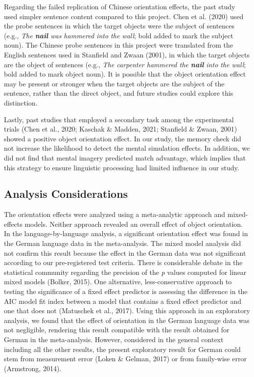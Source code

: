 \documentclass[
  man,floatsintext]{apa7}
\begin{document}
Regarding the failed replication of Chinese orientation effects, the
past study used simpler sentence content compared to this project.
Chen et al. (2020) used the probe sentences in which the target
objects were the subject of sentences (e.g., \emph{The \textbf{nail} was hammered
into the wall}; bold added to mark the subject noun). The Chinese probe
sentences in this project were translated from the English sentences
used in Stanfield and Zwaan (2001), in which the target objects are the
object of sentences (e.g., \emph{The carpenter hammered the \textbf{nail} into the
wall}; bold added to mark object noun). It is possible that the object
orientation effect may be present or stronger when the target objects
are the subject of the sentence, rather than the direct object, and
future studies could explore this distinction.

Lastly, past studies that employed a secondary task among the
experimental trials (Chen et al., 2020; Kaschak \& Madden, 2021; Stanfield \& Zwaan, 2001) showed a
positive object orientation effect. In our study, the memory check did
not increase the likelihood to detect the mental simulation effects. In
addition, we did not find that mental imagery predicted match advantage,
which implies that this strategy to ensure linguistic processing had
limited influence in our study.

\hypertarget{analysis-considerations}{%
\subsection{Analysis Considerations}\label{analysis-considerations}}

The orientation effects were analyzed using a meta-analytic approach and
mixed-effects models. Neither approach revealed an overall effect of
object orientation. In the language-by-language analysis, a significant
orientation effect was found in the German language data in the
meta-analysis. The mixed model analysis did not confirm this result
because the effect in the German data was not significant according to
our pre-registered test criteria. There is considerable debate in the
statistical community regarding the precision of the \emph{p} values computed
for linear mixed models (Bolker, 2015). One alternative,
less-conservative approach to testing the significance of a fixed effect
predictor is assessing the difference in the AIC model fit index between
a model that contains a fixed effect predictor and one that does not
(Matuschek et al., 2017). Using this approach in an exploratory analysis, we
found that the effect of orientation in the German language data was not
negligible, rendering this result compatible with the result obtained
for German in the meta-analysis. However, considered in the general
context including all the other results, the present exploratory result
for German could stem from measurement error
(Loken \& Gelman, 2017) or from family-wise error
(Armstrong, 2014).
\end{document}
